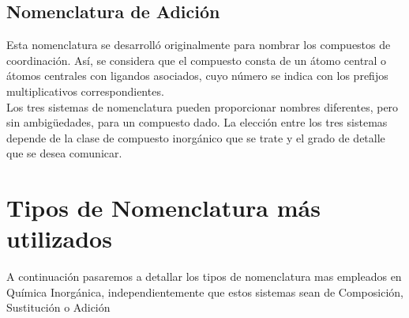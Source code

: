\subsection{Nomenclatura de Adición}
Esta nomenclatura se desarrolló originalmente para nombrar los compuestos de coordinación. Así, se considera que el compuesto consta de un átomo central o átomos centrales con ligandos asociados, cuyo número se indica con los prefijos multiplicativos correspondientes.\\
Los tres sistemas de nomenclatura pueden proporcionar nombres diferentes, pero sin  ambigüedades, para un compuesto dado. La elección entre los tres sistemas depende de la clase de compuesto inorgánico que se trate y el grado de detalle que se desea comunicar.
\section{Tipos de Nomenclatura más utilizados}
A continuación pasaremos a detallar los tipos de nomenclatura mas empleados en Química Inorgánica, independientemente que estos sistemas sean de Composición, Sustitución o Adición\\
